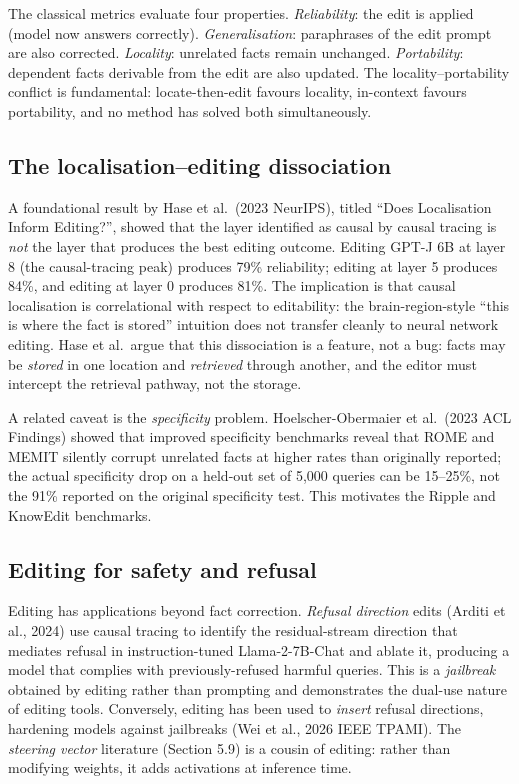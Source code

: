 \documentclass{article}
\begin{document}
The classical metrics evaluate four properties. \emph{Reliability}: the edit is applied (model now answers correctly). \emph{Generalisation}: paraphrases of the edit prompt are also corrected. \emph{Locality}: unrelated facts remain unchanged. \emph{Portability}: dependent facts derivable from the edit are also updated. The locality--portability conflict is fundamental: locate-then-edit favours locality, in-context favours portability, and no method has solved both simultaneously.

\subsection{The localisation--editing dissociation}\label{the-localisationediting-dissociation}

A foundational result by Hase et al.~(2023 NeurIPS), titled ``Does Localisation Inform Editing?'', showed that the layer identified as causal by causal tracing is \emph{not} the layer that produces the best editing outcome. Editing GPT-J 6B at layer 8 (the causal-tracing peak) produces 79\% reliability; editing at layer 5 produces 84\%, and editing at layer 0 produces 81\%. The implication is that causal localisation is correlational with respect to editability: the brain-region-style ``this is where the fact is stored'' intuition does not transfer cleanly to neural network editing. Hase et al.~argue that this dissociation is a feature, not a bug: facts may be \emph{stored} in one location and \emph{retrieved} through another, and the editor must intercept the retrieval pathway, not the storage.

A related caveat is the \emph{specificity} problem. Hoelscher-Obermaier et al.~(2023 ACL Findings) showed that improved specificity benchmarks reveal that ROME and MEMIT silently corrupt unrelated facts at higher rates than originally reported; the actual specificity drop on a held-out set of 5,000 queries can be 15--25\%, not the 91\% reported on the original specificity test. This motivates the Ripple and KnowEdit benchmarks.

\subsection{Editing for safety and refusal}\label{editing-for-safety-and-refusal}

Editing has applications beyond fact correction. \emph{Refusal direction} edits (Arditi et al., 2024) use causal tracing to identify the residual-stream direction that mediates refusal in instruction-tuned Llama-2-7B-Chat and ablate it, producing a model that complies with previously-refused harmful queries. This is a \emph{jailbreak} obtained by editing rather than prompting and demonstrates the dual-use nature of editing tools. Conversely, editing has been used to \emph{insert} refusal directions, hardening models against jailbreaks (Wei et al., 2026 IEEE TPAMI). The \emph{steering vector} literature (Section 5.9) is a cousin of editing: rather than modifying weights, it adds activations at inference time.
\end{document}
